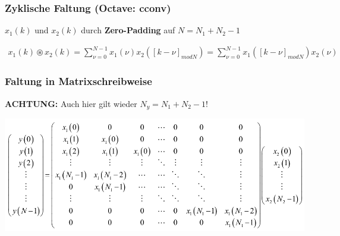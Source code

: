 \documentclass[10pt,a4paper]{article}
\begin{document}
  \subsubsection{Zyklische Faltung (\textbf{Octave:} cconv)}
  $x_1(k)$ und $x_2(k)$ durch \textbf{Zero-Padding} auf $N = N_1 +N_2 -1$ 
\scriptsize
  \begin{mdframed}[style=exercise]
    \begin{align}
        x_1(k) \circledast x_2(k) = \sum_{\nu =0}^{N-1} x_1(\nu) x_2([k-\nu]_{modN})= \sum_{\nu =0}^{N-1}x_1([k-\nu]_{modN}) x_2(\nu)
    \end{align}
  \end{mdframed} 
  \subsubsection{Faltung in Matrixschreibweise}
  \textbf{ACHTUNG:} Auch hier gilt wieder $N_{y}=N_{1}+N_{2}-1$!
  \begin{center}
    \includegraphics[width=.5\textwidth]{./img/Faltung_Matrixschreibweise.png}
\end{center}
\normalsize
\end{document}
